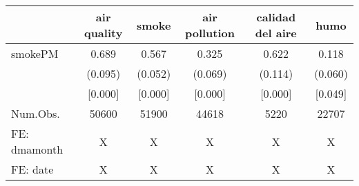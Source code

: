 \begin{table}
\centering
\begin{tabular}[t]{lccccc}
\toprule
  & air quality & smoke & air pollution & calidad del aire & humo\\
\midrule
smokePM & 0.689 & 0.567 & 0.325 & 0.622 & 0.118\\
 & (0.095) & (0.052) & (0.069) & (0.114) & (0.060)\\
 & {}[0.000] & {}[0.000] & {}[0.000] & {}[0.000] & {}[0.049]\\
\midrule
Num.Obs. & 50600 & 51900 & 44618 & 5220 & 22707\\
FE: dmamonth & X & X & X & X & X\\
FE: date & X & X & X & X & X\\
\bottomrule
\end{tabular}
\end{table}
